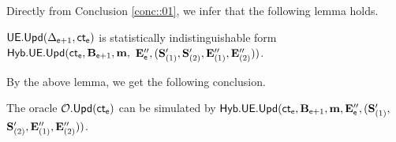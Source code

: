 \documentclass{fundam}
\begin{document}

\vspace{1cm}

\noindent Directly from Conclusion \ref{conc::01}, we infer that the following lemma holds.
\begin{lemma}
	$\mathsf{UE.Upd}( \Delta_{\mathsf{e}+1}, \mathsf{ct}_{\mathsf{e}})$ is statistically indistinguishable form $\mathsf{Hyb.UE.Upd}(\mathsf{ct}_{\mathsf{e}}, \mathbf{B}_{\mathsf{e}+1},\mathbf{m},$ $ \mathbf{E}_{\mathsf{e}}'', (\mathbf{S}_{(1)}', \mathbf{S}_{(2)}', \mathbf{E}_{(1)}'', \mathbf{E}_{(2)}''))$.	
\end{lemma}	

\noindent By the above lemma, we get the following conclusion. 

\begin{concl}\label{conc::02}
	The oracle $\mathcal{O}.\mathsf{Upd}(\mathsf{ct}_{\mathsf{e}})$ can be simulated by $\mathsf{Hyb.UE.Upd}(\mathsf{ct}_{\mathsf{e}}, \mathbf{B}_{\mathsf{e}+1},\mathbf{m}, \mathbf{E}_{\mathsf{e}}'', (\mathbf{S}_{(1)}',$ $\mathbf{S}_{(2)}', \mathbf{E}_{(1)}'', \mathbf{E}_{(2)}''))$.	
\end{concl}
\end{document}
